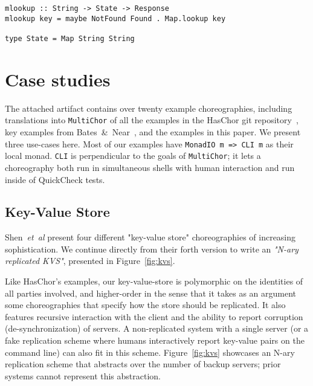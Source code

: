 \documentclass[sigplan,screen]{acmart}
\newcommand{\HasChor}{Has\-Chor\xspace}
\newcommand{\inlinecode}[2][haskell]{\texttt{#2}}
\newcommand{\MultiChor}{\texttt{Multi\-Chor}\xspace}
\begin{document}
\begin{figure*}
\begin{mdframed}
\begin{verbatim}
mlookup :: String -> State -> Response
mlookup key = maybe NotFound Found . Map.lookup key

type State = Map String String
\end{verbatim}
\caption{A system for building key-value-store choreographies,
         including an example backup strategy that's polymorphic on the number of backup servers.}
\label{fig:kvs}
\end{mdframed}
\end{figure*}

\section{Case studies}\label{sec:examples}
The attached artifact contains over twenty example choreographies,
including translations into \MultiChor of all the examples in
the \HasChor git repository~\cite{haschor-repo},
key examples from Bates~\&~Near~\cite{bates2024know},
and the examples in this paper.
We present three use-cases here.
Most of our examples have \inlinecode{MonadIO m => CLI m} as their local monad.
\inlinecode{CLI} is perpendicular to the goals of \MultiChor;
it lets a choreography both run in simultaneous shells with human interaction and
run inside of QuickCheck tests.

\subsection{Key-Value Store}\label{sec:kvs}
Shen~\textit{et~al} present four different "key-value store" choreographies of increasing
sophistication.
We continue directly from their forth version to write an \emph{"N-ary replicated KVS"},
presented in Figure~\ref{fig:kvs}.

Like \HasChor's examples, our key-value-store is polymorphic on the identities of all parties
involved, and higher-order in the sense that it takes as an argument some choreographies
that specify how the store should be replicated.
It also features recursive interaction with the client and the ability to report corruption
(de-synchronization) of servers.
A non-replicated system with a single server
(or a fake replication scheme
where humans interactively report key-value pairs on the command line)
can also fit in this scheme.
Figure~\ref{fig:kvs} showcases an N-ary replication scheme
that abstracts over the number of backup servers;
prior systems cannot represent this abstraction.
\end{document}
